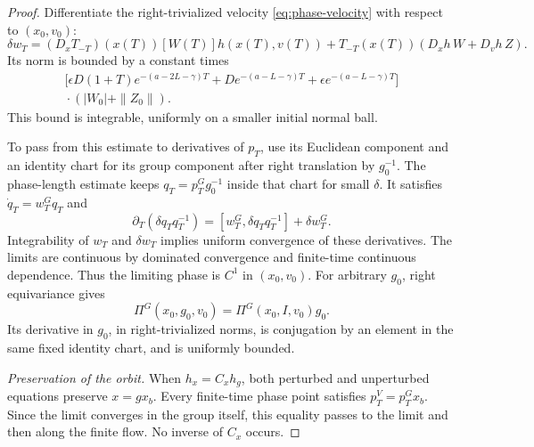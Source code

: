 \begin{proof}
Differentiate the right-trivialized velocity
\eqref{eq:phase-velocity} with respect to $(x_0,v_0)$:
\begin{equation}\label{eq:phase-velocity-derivative}
 \delta w_T=(D_xT_{-T})(x(T))[W(T)]h(x(T),v(T))
       +T_{-T}(x(T))(D_xh\,W+D_vh\,Z).
\end{equation}
Its norm is bounded by a constant times
\begin{multline}\label{eq:integrable-derivative}
 \bigl[\epsilon D(1+T)e^{-(a-2L-\gamma)T}
       +D e^{-(a-L-\gamma)T}
       +\epsilon e^{-(a-L-\gamma)T}\bigr]\\
 {}\cdot(|W_0|+\|Z_0\|).
\end{multline}
This bound is integrable, uniformly on a smaller initial
normal ball.

To pass from this estimate to derivatives of $p_T$, use
its Euclidean component and an identity chart for its
group component after right translation by $g_0^{-1}$.
The phase-length estimate keeps
$q_T=p_T^Gg_0^{-1}$ inside that chart for small $\delta$.
It satisfies $\dot q_T=w_T^Gq_T$ and
\[
 \partial_T(\delta q_Tq_T^{-1})
       =[w_T^G,\delta q_Tq_T^{-1}]+\delta w_T^G.
\]
Integrability of $w_T$ and $\delta w_T$ implies uniform
convergence of these derivatives. The limits are continuous
by dominated convergence and finite-time continuous
dependence. Thus the limiting phase is $C^1$ in $(x_0,v_0)$.
For arbitrary $g_0$, right equivariance gives
\[
 \Pi^G(x_0,g_0,v_0)=\Pi^G(x_0,I,v_0)g_0.
\]
Its derivative in $g_0$, in right-trivialized norms, is
conjugation by an element in the same fixed identity
chart, and is uniformly bounded.

\smallskip
\emph{Preservation of the orbit.}
When $h_x=C_xh_g$, both perturbed and unperturbed
equations preserve $x=gx_b$. Every finite-time phase
point satisfies $p_T^V=p_T^Gx_b$. Since the limit
converges in the group itself, this equality passes
to the limit and then along the finite flow.
No inverse of $C_x$ occurs.
\end{proof}
